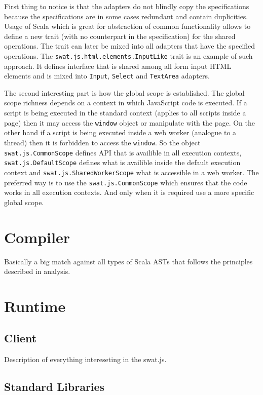 \documentclass[12pt,a4paper]{report}
\begin{document}
First thing to notice is that the adapters do not blindly copy the specifications because the specifications are in some cases redundant and contain duplicities. Usage of Scala which is great for abstraction of common functionality allows to define a new trait (with no counterpart in the specification) for the shared operations. The trait can later be mixed into all adapters that have the specified operations. The \texttt{swat.js.html.elements.InputLike} trait is an example of such approach. It defines interface that is shared among all form input HTML elements and is mixed into \texttt{Input}, \texttt{Select} and \texttt{TextArea} adapters.

The second interesting part is how the global scope is established. The global scope richness depends on a context in which JavaScript code is executed. If a script is being executed in the standard context (applies to all scripts inside a page) then it may access the \texttt{window} object or manipulate with the page. On the other hand if a script is being executed inside a web worker (analogue to a thread) then it is forbidden to access the \texttt{window}. So the object \texttt{swat.js.CommonScope} defines API that is availible in all execution contexts, \texttt{swat.js.DefaultScope} defines what is availible inside the default execution context and \texttt{swat.js.SharedWorkerScope} what is accessible in a web worker. The preferred way is to use the \texttt{swat.js.CommonScope} which ensures that the code works in all execution contexts. And only when it is required use a more specific global scope.

\section{Compiler}

Basically a big match against all types of Scala ASTs that follows the principles described in analysis.

\section{Runtime}

\subsection{Client}

Description of everything intereseting in the swat.js.

\subsection{Standard Libraries}
\end{document}
